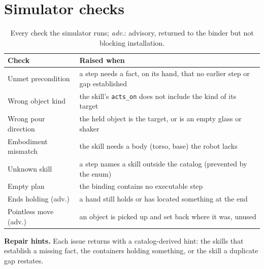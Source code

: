 \documentclass[10pt,twocolumn,letterpaper]{article}
\newcommand{\code}[1]{\texttt{\small #1}}
\begin{document}
\section{Simulator checks}\label{app:checks}
\begin{table}[h]
\centering\small
\caption{Every check the simulator runs; \emph{adv.}: advisory, returned to the binder but not blocking installation.}
\begin{tabular}{@{}p{}p{}@{}}
\toprule
Check & Raised when\\
\midrule
Unmet precondition & a step needs a fact, on its hand, that no earlier step or gap established\\
Wrong object kind & the skill's \code{acts\_on} does not include the kind of its target\\
Wrong pour direction & the held object is the target, or is an empty glass or shaker\\
Embodiment mismatch & the skill needs a body (torso, base) the robot lacks\\
Unknown skill & a step names a skill outside the catalog (prevented by the enum)\\
Empty plan & the binding contains no executable step\\
Ends holding (adv.) & a hand still holds or has located something at the end\\
Pointless move (adv.) & an object is picked up and set back where it was, unused\\
\bottomrule
\end{tabular}
\end{table}
\textbf{Repair hints.} Each issue returns with a catalog-derived hint: the skills that establish a missing fact, the
containers holding something, or the skill a duplicate gap restates.
\end{document}
